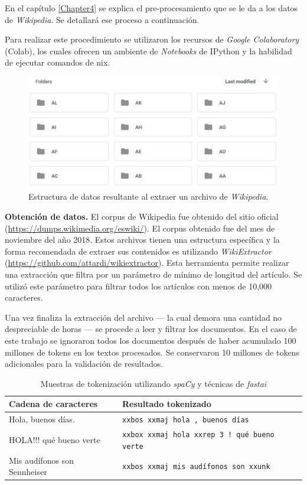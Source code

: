 En el capítulo \ref{Chapter4} se explica el pre-procesamiento que se le da a los datos de \textit{Wikipedia}. Se detallará ese proceso a continuación.

Para realizar este procedimiento se utilizaron los recursos de \emph{Google Colaboratory} (Colab), los cuales ofrecen un ambiente de \textit{Notebooks} de IPython y la habilidad de ejecutar comandos de \*nix.

\begin{figure}
\centering
\includegraphics[scale=0.7]{Figures/wikidump.pdf}
\caption{Estructura de datos resultante al extraer un archivo de \textit{Wikipedia}.}
\label{fig:wikidump}
\end{figure}


\textbf{Obtención de datos.} El corpus de Wikipedia fue obtenido del sitio oficial (\url{https://dumps.wikimedia.org/eswiki/}). El corpus obtenido fue del mes de noviembre del año 2018. Estos archivos tienen una estructura específica y la forma recomendada de extraer sus contenidos es utilizando \emph{WikiExtractor} (\url{https://github.com/attardi/wikiextractor}). Esta herramienta permite realizar una extracción que filtra por un parámetro de mínimo de longitud del artículo. Se utilizó este parámetro para filtrar todos los artículos con menos de 10,000 caracteres.

Una vez finaliza la extracción del archivo --- la cual demora una cantidad no despreciable de horas --- se procede a leer y filtrar los documentos. En el caso de este trabajo se ignoraron todos los documentos después de haber acumulado 100 millones de tokens en los textos procesados. Se conservaron 10 millones de tokens adicionales para la validación de resultados.

\begin{table}
\begin{tabular}{| l | l |}

\hline
\textbf{Cadena de caracteres} & \textbf{Resultado tokenizado} \\
\hline
Hola, buenos días. & \texttt{xxbos xxmaj hola , buenos días} \\
HOLA!!! qué bueno verte & \texttt{xxbox xxmaj hola xxrep 3 ! qué bueno verte} \\
Mis audífonos son Sennheiser & \texttt{xxbos xxmaj mis audífonos son xxunk} \\
\hline

\end{tabular}
\caption{Muestras de tokenización utilizando \textit{spaCy} y técnicas de \textit{fastai}}
\label{tab:tokens}
\end{table}

